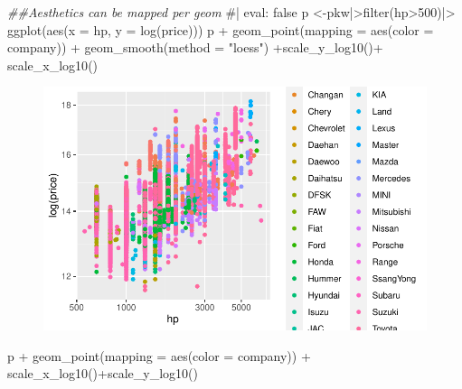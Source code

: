 \documentclass[
  letterpaper,
  DIV=11,
  numbers=noendperiod]{scrartcl}
\newenvironment{Shaded}{\begin{snugshade}}{\end{snugshade}}
\newcommand{\AttributeTok}[1]{\textcolor[rgb]{0.40,0.45,0.13}{#1}}
\newcommand{\CommentTok}[1]{\textcolor[rgb]{0.37,0.37,0.37}{#1}}
\newcommand{\DecValTok}[1]{\textcolor[rgb]{0.68,0.00,0.00}{#1}}
\newcommand{\DocumentationTok}[1]{\textcolor[rgb]{0.37,0.37,0.37}{\textit{#1}}}
\newcommand{\FunctionTok}[1]{\textcolor[rgb]{0.28,0.35,0.67}{#1}}
\newcommand{\NormalTok}[1]{\textcolor[rgb]{0.00,0.23,0.31}{#1}}
\newcommand{\OtherTok}[1]{\textcolor[rgb]{0.00,0.23,0.31}{#1}}
\newcommand{\SpecialCharTok}[1]{\textcolor[rgb]{0.37,0.37,0.37}{#1}}
\newcommand{\StringTok}[1]{\textcolor[rgb]{0.13,0.47,0.30}{#1}}
\begin{document}
\begin{Shaded}
\begin{Highlighting}[]
\DocumentationTok{\#\#Aesthetics can be mapped per geom}
\CommentTok{\#| eval: false}
\NormalTok{p }\OtherTok{\textless{}{-}}\NormalTok{pkw}\SpecialCharTok{|\textgreater{}}\FunctionTok{filter}\NormalTok{(hp}\SpecialCharTok{\textgreater{}}\DecValTok{500}\NormalTok{)}\SpecialCharTok{|\textgreater{}} \FunctionTok{ggplot}\NormalTok{(}\FunctionTok{aes}\NormalTok{(}\AttributeTok{x =}\NormalTok{ hp, }\AttributeTok{y =} \FunctionTok{log}\NormalTok{(price)))}
\NormalTok{p }\SpecialCharTok{+} \FunctionTok{geom\_point}\NormalTok{(}\AttributeTok{mapping =} \FunctionTok{aes}\NormalTok{(}\AttributeTok{color =}\NormalTok{ company)) }\SpecialCharTok{+}
  \FunctionTok{geom\_smooth}\NormalTok{(}\AttributeTok{method =} \StringTok{"loess"}\NormalTok{) }\SpecialCharTok{+}\FunctionTok{scale\_y\_log10}\NormalTok{()}\SpecialCharTok{+}
  \FunctionTok{scale\_x\_log10}\NormalTok{()}
\end{Highlighting}
\end{Shaded}

\begin{figure}[H]

{\centering \includegraphics[width=17.1875in,height=\textheight]{pakwheels_files/figure-pdf/unnamed-chunk-35-1.pdf}

}

\end{figure}

\begin{Shaded}
\begin{Highlighting}[]


\NormalTok{p }\SpecialCharTok{+} \FunctionTok{geom\_point}\NormalTok{(}\AttributeTok{mapping =} \FunctionTok{aes}\NormalTok{(}\AttributeTok{color =}\NormalTok{ company)) }\SpecialCharTok{+}
  \FunctionTok{scale\_x\_log10}\NormalTok{()}\SpecialCharTok{+}\FunctionTok{scale\_y\_log10}\NormalTok{()}
\end{Highlighting}
\end{Shaded}
\end{document}
